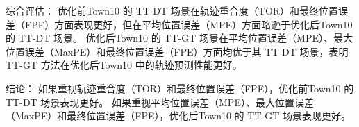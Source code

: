 综合评估：
优化前Town10 的 TT-DT 场景在轨迹重合度（TOR）和最终位置误差（FPE）方面表现更好，但在平均位置误差（MPE）方面略逊于优化后Town10 的 TT-DT 场景。
优化后Town10 的 TT-GT 场景在平均位置误差（MPE）、最大位置误差（MaxPE）和最终位置误差（FPE）方面均优于其 TT-DT 场景，表明 TT-GT 方法在优化后Town10 中的轨迹预测性能更好。

结论：
如果重视轨迹重合度（TOR）和最终位置误差（FPE），优化前Town10 的 TT-DT 场景表现更好。
如果重视平均位置误差（MPE）、最大位置误差（MaxPE）和最终位置误差（FPE），优化后Town10 的 TT-GT 场景表现更好。



















